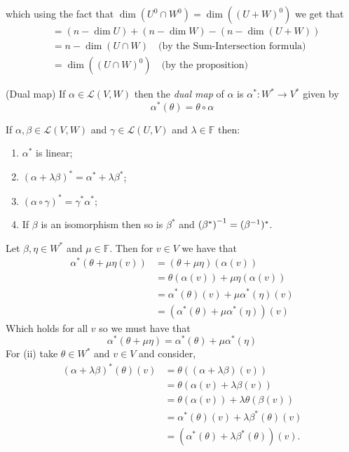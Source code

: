 \documentclass{article}
\newcommand{\F}{\mathbb{F}}
\begin{document}
which using the fact that $ \dim(U^0\cap W^0)=\dim((U+W)^0) $ we get that
\begin{align*}
	&=(n-\dim U)+(n-\dim W)-(n-\dim(U+W))\\
	&=n-\dim(U\cap W)\quad\text{(by the Sum-Intersection formula)}\\
	&= \dim((U\cap W)^0) \quad\text{(by the proposition)}
\end{align*}
\begin{definition}
	(Dual map) If $ \alpha\in\mathcal L(V,W) $ then the \textit{dual map} of $ \alpha $ is $ \alpha^*:W^*\to V^* $ given by
	\[
	  \alpha^*(\theta)=\theta\circ \alpha
	\]
\end{definition}
\begin{lemma}
  If $ \alpha,\beta\in \mathcal L(V,W) $ and $ \gamma\in\mathcal L(U,V) $ and $ \lambda \in \F $ then:
  \begin{enumerate}
	  \item $ \alpha^* $ is linear;
	  \item $ (\alpha+\lambda\beta)^*=\alpha^*+\lambda\beta^* $;
	  \item $ (\alpha\circ \gamma)^*=\gamma^*\alpha^* $;
	  \item If $ \beta $ is an isomorphism then so is $ \beta^* $ and ${(\beta^*)}^{-1}=({\beta}^{-1})^* $.
  \end{enumerate}
\end{lemma}
\pf Let $ \beta, \eta \in W^* $ and $ \mu \in \F $. Then for $ v\in V $ we have that
\begin{align*}
	\alpha^*(\theta+\mu\eta(v))&=(\theta+\mu\eta)(\alpha(v))\\
				   &= \theta(\alpha(v))+\mu\eta(\alpha(v))\\
				   &= \alpha^*(\theta)(v)+\mu\alpha^*(\eta)(v)\\
				   &=(\alpha^*(\theta)+\mu\alpha^*(\eta))(v)
\end{align*}
Which holds for all $ v $ so we must have that
\[
  \alpha^*(\theta+\mu\eta)=\alpha^*(\theta)+\mu\alpha^*(\eta)
\]
For (ii) take $ \theta\in W^* $ and $ v\in V $ and consider,
\begin{align*}
	(\alpha+\lambda\beta)^*(\theta)(v)&=\theta((\alpha+\lambda\beta)(v))\\
					  &=\theta(\alpha(v)+\lambda\beta(v))\\
					  &=\theta(\alpha(v))+\lambda\theta(\beta(v))\\
					  &=\alpha^*(\theta)(v)+\lambda\beta^*(\theta)(v)\\
					  &=(\alpha^*(\theta)+\lambda\beta^*(\theta))(v).
\end{align*}
\end{document}
